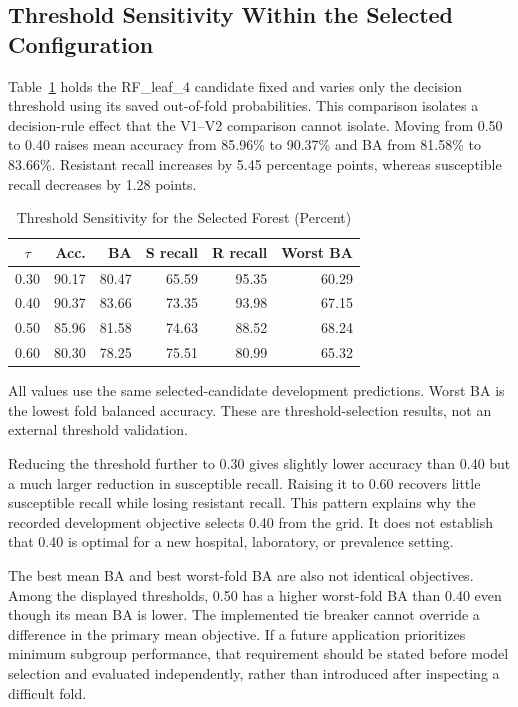 \subsection{Threshold Sensitivity Within the Selected Configuration}
Table~\ref{tab:threshold} holds the RF\_leaf\_4 candidate fixed and varies only the decision threshold using its saved out-of-fold probabilities. This comparison isolates a decision-rule effect that the V1--V2 comparison cannot isolate. Moving from 0.50 to 0.40 raises mean accuracy from 85.96\% to 90.37\% and BA from 81.58\% to 83.66\%. Resistant recall increases by 5.45 percentage points, whereas susceptible recall decreases by 1.28 points.

\begin{table}[t]
\caption{Threshold Sensitivity for the Selected Forest (Percent)}
\label{tab:threshold}
\centering\footnotesize
\begin{tabular}{crrrrr}\toprule
$\tau$ & Acc. & BA & S recall & R recall & Worst BA\\\midrule
0.30&90.17&80.47&65.59&95.35&60.29\\
0.40&90.37&83.66&73.35&93.98&67.15\\
0.50&85.96&81.58&74.63&88.52&68.24\\
0.60&80.30&78.25&75.51&80.99&65.32\\\bottomrule
\end{tabular}
\vspace{3pt}
\parbox{\columnwidth}{\footnotesize All values use the same selected-candidate development predictions. Worst BA is the lowest fold balanced accuracy. These are threshold-selection results, not an external threshold validation.}
\end{table}

Reducing the threshold further to 0.30 gives slightly lower accuracy than 0.40 but a much larger reduction in susceptible recall. Raising it to 0.60 recovers little susceptible recall while losing resistant recall. This pattern explains why the recorded development objective selects 0.40 from the grid. It does not establish that 0.40 is optimal for a new hospital, laboratory, or prevalence setting.

The best mean BA and best worst-fold BA are also not identical objectives. Among the displayed thresholds, 0.50 has a higher worst-fold BA than 0.40 even though its mean BA is lower. The implemented tie breaker cannot override a difference in the primary mean objective. If a future application prioritizes minimum subgroup performance, that requirement should be stated before model selection and evaluated independently, rather than introduced after inspecting a difficult fold.

